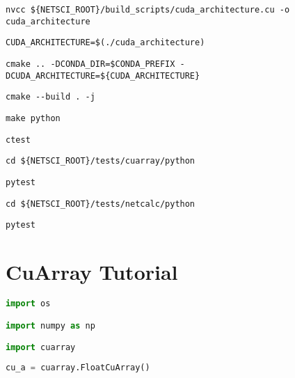 \documentclass{article}
\begin{document}
    \begin{lstlisting}
nvcc ${NETSCI_ROOT}/build_scripts/cuda_architecture.cu -o cuda_architecture
    \end{lstlisting}

    \begin{lstlisting}
CUDA_ARCHITECTURE=$(./cuda_architecture)
    \end{lstlisting}

    \begin{lstlisting}
cmake .. -DCONDA_DIR=$CONDA_PREFIX -DCUDA_ARCHITECTURE=${CUDA_ARCHITECTURE}
    \end{lstlisting}

    \begin{lstlisting}
cmake --build . -j
    \end{lstlisting}

    \begin{lstlisting}
make python
    \end{lstlisting}

    \begin{lstlisting}
ctest
    \end{lstlisting}

    \begin{lstlisting}
cd ${NETSCI_ROOT}/tests/cuarray/python
    \end{lstlisting}

    \begin{lstlisting}
pytest
    \end{lstlisting}

    \begin{lstlisting}
cd ${NETSCI_ROOT}/tests/netcalc/python
    \end{lstlisting}

    \begin{lstlisting}
pytest
    \end{lstlisting}


    \section{CuArray Tutorial}
    \begin{lstlisting}[language=Python]
import os

import numpy as np

import cuarray
    \end{lstlisting}

    \begin{lstlisting}[language=Python]
cu_a = cuarray.FloatCuArray()
    \end{lstlisting}
\end{document}
